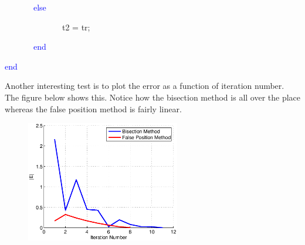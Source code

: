 \begin{enumerate}
\begin{framed}
~~~~~~~\textcolor{blue}{else}

~~~~~~~~~~~~~~t2 = tr;

~~~~~~~\textcolor{blue}{end}

\textcolor{blue}{end}

\end{framed}

Another interesting test is to plot the error as a function of
iteration number. The figure below shows this. Notice how the
bisection method is all over the place whereas the false position
method is fairly linear.

\begin{figure}[htb]
  \begin{center}
    \includegraphics[height=0.45\textwidth,width=0.6\textwidth]{Graphics/Error_Comparison}
  \end{center}
\end{figure}

\end{enumerate}

